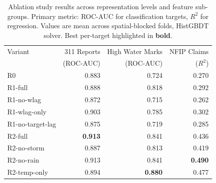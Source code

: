\begin{table}[t]
\centering
\caption{Ablation study results across representation levels and feature sub-groups. Primary metric: ROC-AUC for classification targets, $R^2$ for regression. Values are mean across spatial-blocked folds, HistGBDT solver. Best per-target highlighted in \textbf{bold}.}
\label{tab:ablation}
\small
\begin{tabular}{lrrr}
\toprule
Variant & 311 Reports & High Water Marks & NFIP Claims \\
 & (ROC-AUC) & (ROC-AUC) & ($R^2$) \\
\midrule
R0 & 0.883 & 0.724 & 0.270 \\
\addlinespace
R1-full & 0.888 & 0.818 & 0.292 \\
R1-no-wlag & 0.872 & 0.715 & 0.262 \\
R1-wlag-only & 0.903 & 0.785 & 0.302 \\
R1-no-target-lag & 0.875 & 0.719 & 0.285 \\
\addlinespace
R2-full & \textbf{0.913} & 0.841 & 0.436 \\
R2-no-storm & 0.887 & 0.813 & 0.419 \\
R2-no-rain & 0.913 & 0.841 & \textbf{0.490} \\
R2-temp-only & 0.894 & \textbf{0.880} & 0.477 \\
\bottomrule
\end{tabular}
\end{table}